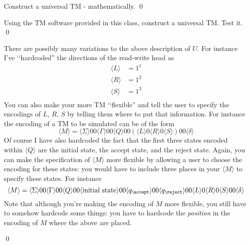 \newpage
\begin{ex}
  Construct a universal TM - mathematically.
  \qed
\end{ex}


\newpage
\begin{ex}
  Using the TM software provided in this class,
  construct a universal TM.
  Test it.
  \qed
\end{ex}


\newpage
\begin{ex}
  There are possibly many variations to the above description of $U$.
  For instance I've \lq\lq hardcoded'' the directions of the read-write head
  as
  \begin{align*}
    \langle L \rangle &= 1^1 \\
    \langle R \rangle &= 1^2 \\
    \langle S \rangle &= 1^3 \\
  \end{align*}
  You can also make your more TM \lq\lq flexible'' and tell the
  user to specify the encodings of $L$, $R$, $S$ by telling them where to
  put that information.
  For instance the encoding of a TM to be simulated can be of the form
  \[
  \langle M \rangle
  =
  \langle \Sigma \rangle 00
  \langle \Gamma \rangle 00
  \langle Q \rangle 00
  (\langle L \rangle 0
  \langle R \rangle 0
  \langle S \rangle) 00
  \langle \delta \rangle  
  \]
  Of course I have also hardcoded the fact that
  the first three states encoded within $\langle Q \rangle$
  are the initial state, the accept state, and the reject state.
  Again, you can make the specification of $\langle M \rangle$
  more flexible by allowing a user to choose the encoding for
  these states: you would have to include three places in your
  $\langle M \rangle$ to specify these states. For instance
  \[
  \langle M \rangle
  =
  \langle \Sigma \rangle 00
  \langle \Gamma \rangle 00
  \langle Q \rangle 00
  \langle \text{initial state} \rangle 00
  \langle q_\accept \rangle 00
  \langle q_\reject \rangle 00  
  \langle L \rangle 0
  \langle R \rangle 0
  \langle S \rangle 00
  \langle \delta \rangle  
  \]
  Note that although you're making the encoding of $M$ more flexible,
  you still have to somehow hardcode some things: you have to
  hardcode the \textit{position} in the encoding of $M$ where
  the above are placed.

  \qed
\end{ex}

